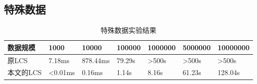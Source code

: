 \subsection{特殊数据}
\begin{table}[H]
  \caption{特殊数据实验结果}
  \centering
  \begin{tabular}{p{2.6cm}<{\centering}p{1.9cm}<{\centering}p{1.9cm}<{\centering}p{1.9cm}<{\centering}p{1.9cm}<{\centering}p{1.9cm}<{\centering}p{1.9cm}<{\centering}}
  \toprule
   数据规模 & 1000 & 10000 & 100000 & 1000000 & 5000000 & 10000000\\
  \midrule
   原LCS & 7.18ms & 878.44ms & 79.29s & >500s & >500s & >500s\\
   本文的LCS & <0.01ms & 0.16ms & 1.14s & 8.16s & 61.23s & 128.04s\\
  \bottomrule
  \end{tabular}
\end{table}